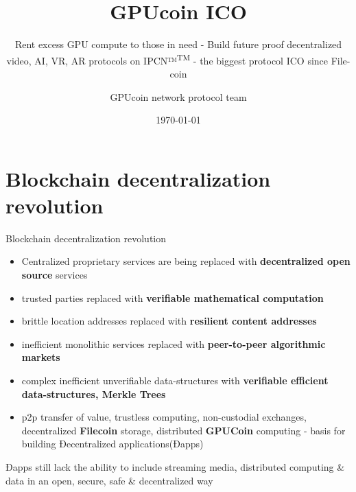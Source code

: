 \documentclass[10pt,handout]{beamer}
\title{ GPUcoin ICO }
\subtitle{Rent excess GPU compute to those in need - Build future proof decentralized video, AI, VR, AR protocols on IPCN™\textsuperscript{TM}
 - the biggest protocol ICO since File-coin}
\date{\today}
\author{GPUcoin network protocol team}
\institute{\href{http://gpuco.in}{GPUcoin Foundation}}
\begin{document}
\maketitle


\section{Blockchain decentralization revolution}
\begin{frame}[fragile]{Blockchain decentralization revolution}
 \begin{itemize}[<+-| alert@+>]%
 
\item Centralized proprietary services are being replaced with \textbf{decentralized open source} services
\item trusted parties replaced with \textbf{verifiable mathematical computation}
\item brittle location addresses replaced with \textbf{resilient content addresses}
\item inefficient monolithic services replaced with \textbf{peer-to-peer algorithmic markets}
\item complex inefficient unverifiable data-structures with \textbf{verifiable efficient data-structures, Merkle Trees}
\item p2p transfer of value, trustless computing, non-custodial exchanges, decentralized \textbf{Filecoin} storage, distributed \textbf{GPUCoin} computing - basis for building Ðecentralized applications(Ðapps)

\end{itemize}
 \pause
Ðapps still lack the ability to include streaming media, distributed computing \& data in an open, secure, safe \& decentralized way

\end{frame}
\end{document}
